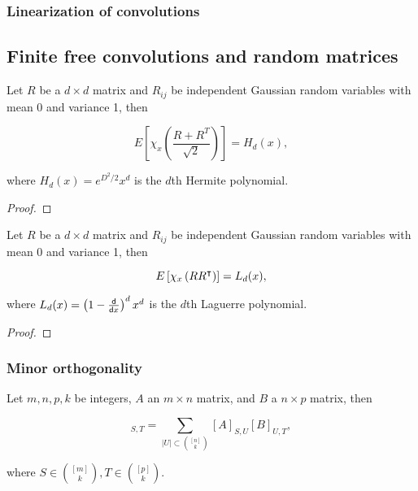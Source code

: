 \subsubsection{Linearization of convolutions}



\subsection{Finite free convolutions and random matrices}

\begin{theorem}
    Let $R$ be a $d\times d$ matrix and $R_{ij}$ be independent Gaussian random variables with mean 0 and variance 1, then

    \begin{equation*}
        E\left[ \chi_x\left( \frac{R + R^T}{\sqrt 2} \right) \right] = H_d(x),
    \end{equation*}

    \noindent where $H_d(x) = e^{D^2/2}x^d$ is the $d$th Hermite polynomial.
\end{theorem}

\begin{proof}
    
\end{proof}


\begin{theorem}
    Let $R$ be a $d\times d$ matrix and $R_{ij}$ be independent Gaussian random variables with mean 0 and variance 1, then

    \begin{equation*}
        E\left[ \chi_x\left(RR^{\intercal}\right) \right] = L_d(x),
    \end{equation*}

    \noindent where $L_d(x) = \left( 1 - \frac{\mathsf d}{\mathsf d x} \right)^d x^d$ is the $d$th Laguerre polynomial.
\end{theorem}

\begin{proof}
    
\end{proof}


\subsubsection{Minor orthogonality}

\begin{theorem} 
    Let $m,n,p,k$ be integers, $A$ an $m\times n$ matrix, and $B$ a $n\times p$ matrix, then

    \begin{equation*}
        [AB]_{S,T} = \sum_{|U|\subset \binom{[n]}{k}} [A]_{S,U} [B]_{U,T},
    \end{equation*}


    \noindent where $S\in \binom{[m]}{k}, T \in \binom{[p]}{k}$.
\end{theorem}


